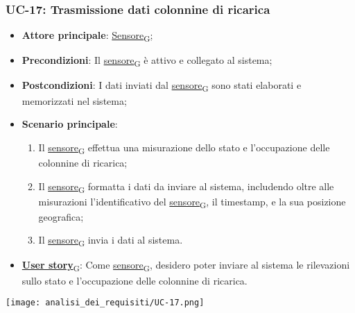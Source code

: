 \subsubsection{UC-17: Trasmissione dati colonnine di ricarica}
\begin{itemize}
	\item \textbf{Attore principale}: \href{https://7last.github.io/docs/rtb/documentazione-interna/glossario\#sensore}{Sensore\textsubscript{G}};
	\item \textbf{Precondizioni}: Il \href{https://7last.github.io/docs/rtb/documentazione-interna/glossario\#sensore}{sensore\textsubscript{G}} è attivo e collegato al sistema;
	\item \textbf{Postcondizioni}: I dati inviati dal \href{https://7last.github.io/docs/rtb/documentazione-interna/glossario\#sensore}{sensore\textsubscript{G}} sono stati elaborati e memorizzati nel sistema;
	\item \textbf{Scenario principale}:
	      \begin{enumerate}
		      \item Il \href{https://7last.github.io/docs/rtb/documentazione-interna/glossario\#sensore}{sensore\textsubscript{G}} effettua una misurazione dello stato e l'occupazione delle colonnine di ricarica;
		      \item Il \href{https://7last.github.io/docs/rtb/documentazione-interna/glossario\#sensore}{sensore\textsubscript{G}} formatta i dati da inviare al sistema, includendo oltre alle misurazioni l'identificativo del \href{https://7last.github.io/docs/rtb/documentazione-interna/glossario\#sensore}{sensore\textsubscript{G}},
		            il timestamp, e la sua posizione geografica;
		      \item Il \href{https://7last.github.io/docs/rtb/documentazione-interna/glossario\#sensore}{sensore\textsubscript{G}} invia i dati al sistema.
	      \end{enumerate}
	\item \href{https://7last.github.io/docs/rtb/documentazione-interna/glossario\#user-story}{\textbf{User story}\textsubscript{G}}: Come \href{https://7last.github.io/docs/rtb/documentazione-interna/glossario\#sensore}{sensore\textsubscript{G}}, desidero poter inviare al sistema le rilevazioni sullo stato e l'occupazione delle colonnine di ricarica.
\end{itemize}
\begin{center}
	\texttt{[image: analisi\_dei\_requisiti/UC-17.png]}
\end{center}


